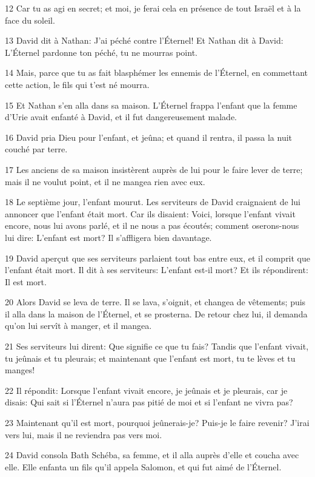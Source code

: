 \par 12 Car tu as agi en secret; et moi, je ferai cela en présence de tout Israël et à la face du soleil.
\par 13 David dit à Nathan: J'ai péché contre l'Éternel! Et Nathan dit à David: L'Éternel pardonne ton péché, tu ne mourras point.
\par 14 Mais, parce que tu as fait blasphémer les ennemis de l'Éternel, en commettant cette action, le fils qui t'est né mourra.
\par 15 Et Nathan s'en alla dans sa maison. L'Éternel frappa l'enfant que la femme d'Urie avait enfanté à David, et il fut dangereusement malade.
\par 16 David pria Dieu pour l'enfant, et jeûna; et quand il rentra, il passa la nuit couché par terre.
\par 17 Les anciens de sa maison insistèrent auprès de lui pour le faire lever de terre; mais il ne voulut point, et il ne mangea rien avec eux.
\par 18 Le septième jour, l'enfant mourut. Les serviteurs de David craignaient de lui annoncer que l'enfant était mort. Car ils disaient: Voici, lorsque l'enfant vivait encore, nous lui avons parlé, et il ne nous a pas écoutés; comment oserons-nous lui dire: L'enfant est mort? Il s'affligera bien davantage.
\par 19 David aperçut que ses serviteurs parlaient tout bas entre eux, et il comprit que l'enfant était mort. Il dit à ses serviteurs: L'enfant est-il mort? Et ils répondirent: Il est mort.
\par 20 Alors David se leva de terre. Il se lava, s'oignit, et changea de vêtements; puis il alla dans la maison de l'Éternel, et se prosterna. De retour chez lui, il demanda qu'on lui servît à manger, et il mangea.
\par 21 Ses serviteurs lui dirent: Que signifie ce que tu fais? Tandis que l'enfant vivait, tu jeûnais et tu pleurais; et maintenant que l'enfant est mort, tu te lèves et tu manges!
\par 22 Il répondit: Lorsque l'enfant vivait encore, je jeûnais et je pleurais, car je disais: Qui sait si l'Éternel n'aura pas pitié de moi et si l'enfant ne vivra pas?
\par 23 Maintenant qu'il est mort, pourquoi jeûnerais-je? Puis-je le faire revenir? J'irai vers lui, mais il ne reviendra pas vers moi.
\par 24 David consola Bath Schéba, sa femme, et il alla auprès d'elle et coucha avec elle. Elle enfanta un fils qu'il appela Salomon, et qui fut aimé de l'Éternel.
